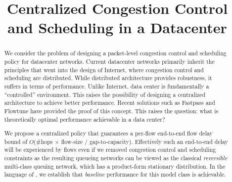 \documentclass[ssy,preprint]{imsart_axv}
\numberwithin{equation}{section}
\theoremstyle{plain}
\theoremstyle{definition}
\theoremstyle{remark}
\theoremstyle{plain}
\theoremstyle{plain}
\begin{document}
	
\begin{frontmatter}	
\title{Centralized Congestion Control and Scheduling in a Datacenter}






\begin{abstract}

We consider the problem of designing a packet-level congestion control
and scheduling policy for datacenter networks. Current datacenter
networks primarily inherit the principles that went into the design of Internet,
where congestion control and scheduling are distributed. While distributed
architecture provides robustness, it suffers in terms of performance. 
Unlike Internet, data center is fundamentally a ``controlled'' 
environment. This raises the possibility of designing a centralized architecture
to achieve better performance. Recent solutions such as Fastpass \cite{perry2014fastpass}
and Flowtune \cite{perry17flowtune} have provided the proof of this concept. This
raises the question: what is theoretically optimal performance achievable 
in a data center?

We propose a centralized policy that guarantees a per-flow end-to-end
flow delay bound of $O$(\#hops $\times$ flow-size $/$ gap-to-capacity). 
Effectively such an end-to-end delay will be experienced by flows even if we
removed congestion control and scheduling constraints as the resulting 
queueing networks can be viewed as the classical {\em reversible} multi-class 
queuing network, which has a product-form stationary distribution. In the language
of \cite{harrison2014bandwidth}, we establish that {\em baseline} performance for
this model class is achievable.


\end{abstract}
\end{frontmatter}
\end{document}
